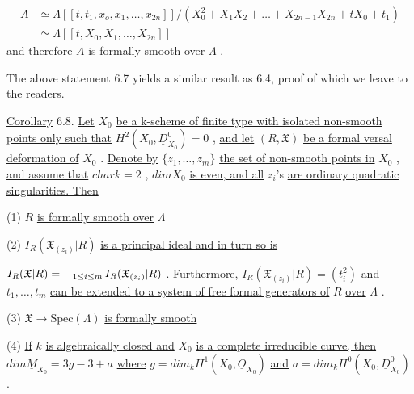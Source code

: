 \begin{equation*}
\begin{aligned} A &\simeq \Lambda[[t, t_1, x_o, x_1, \ldots, x_{2n}]]/(X_0^2 + X_1X_2 + \ldots + X_{2n-1}X_{2n} + tX_0 + t_1) \\ &\simeq \Lambda[[t, X_0, X_1,\ldots,X_{2n}]] \end{aligned}
\end{equation*}
and therefore  $A$  is formally smooth over  $\Lambda$  .

The above statement 6.7 yields a similar result as 6.4, proof of which we leave to the readers.

\underline{Corollary} 6.8.  \underline{Let}  $X_0$  \underline{be a k-scheme of finite type with isolated non-smooth points only such that}  $H^2(X_0, \underline{D}^0_{X_0}) = 0$  , \underline{and let}  $(R, \mathfrak{X})$  \underline{be a formal versal deformation of}  $X_0$  . \underline{Denote by}  $\{z_1, \ldots, z_m\}$  \underline{the set of non-smooth points in} $X_0$  , \underline{and assume that}  $char k = 2$  , $dim X_0$  \underline{is even, and all}  $z_i$'s  \underline{are ordinary quadratic singularities. Then}

(1)  $R$  \underline{is formally smooth over}  $\Lambda$

(2)  $I_R(\mathfrak{X}_{(z_i)}|R)$  \underline{is a principal ideal and in turn so is}

$I_R(\mathfrak{X}|R) = \mathop{\hphantom{\bigcap}}_{1 \leq i \leq m} I_R(\mathfrak{X}_{(z_i)}|R)$  . \underline{Furthermore,}  $I_R(\mathfrak{X}_{(z_i)}|R) = (t_i^2)$  \underline{and} $t_1, \ldots , t_m$  \underline{can be extended to a system of free formal generators of}  $R$  \underline{over} $\Lambda$  .

(3)  $\mathfrak{X} \to \mathrm{Spec}(\Lambda)$  \underline{is formally smooth}

(4)  \underline{If}  $k$  \underline{is algebraically closed and}  $X_0$  \underline{is a complete irreducible curve, then}  $dim \underline{M}_{X_0} = 3g - 3 + a$  \underline{where}  $g = dim_k H^1(X_0, \underline{O}_{X_0})$  \underline{and} $a = dim_k H^0(X_0, \underline{D}^0_{X_0})$  .
